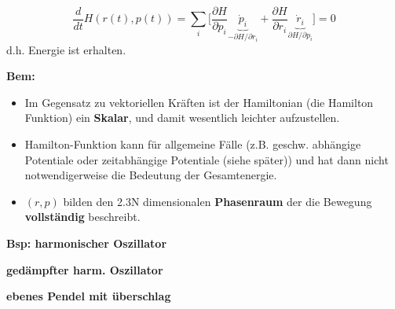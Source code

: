 \documentclass[titlepage,12pt,a4paper,ngerman]{report}
\begin{document}
$$\frac{d}{dt} H(r(t),p(t)) = \sum_i \bigg[ \frac{\partial H}{\partial p_i} \underbrace{\dot{p}_i}_{ -\partial H / \partial r_i} + \frac{\partial H}{\partial r_i} \underbrace{\dot{r}_i}_{\partial H / \partial p_i} \bigg] = 0$$
d.h. Energie ist erhalten.\par
\textbf{Bem:}
\begin{itemize}
	\item Im Gegensatz zu vektoriellen Kräften ist der Hamiltonian (die Hamilton Funktion) ein \textbf{Skalar}, und damit wesentlich leichter aufzustellen.
	\item Hamilton-Funktion kann für allgemeine Fälle (z.B. geschw. abhängige Potentiale oder zeitabhängige Potentiale (siehe später)) und hat dann nicht notwendigerweise die Bedeutung der Gesamtenergie.
	\item $(r,p)$ bilden den 2.3N dimensionalen \textbf{Phasenraum} der die Bewegung \textbf{vollständig} beschreibt.
\end{itemize}

\textbf{Bsp: harmonischer Oszillator}


\textbf{gedämpfter harm. Oszillator}


\textbf{ebenes Pendel mit überschlag}

\end{document}
